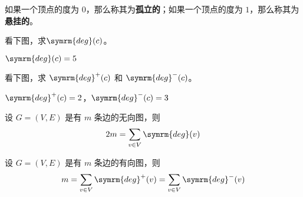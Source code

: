 如果一个顶点的度为 $0$，那么称其为\textbf{孤立的}；如果一个顶点的度为 $1$，那么称其为\textbf{悬挂的}。
\begin{collections}
    \begin{example}
        看下图，求$\symrm{deg}(c)$。
            \begin{center}
            \end{center}
    \end{example}
    \begin{solution}
        $\symrm{deg}(c)=5$
    \end{solution}
    \spare
    \begin{example}
        看下图，求 $\symrm{deg}^+(c)$ 和 $\symrm{deg}^-(c)$。
            \begin{center}
            \end{center}
    \end{example}
    \begin{solution}
        $\symrm{deg}^+(c)=2$，$\symrm{deg}^-(c)=3$
    \end{solution}
\end{collections}

\begin{theorem}[无向图的握手定理]\label{thm:无向图的握手定理}
    设 $G=(V,E)$ 是有 $m$ 条边的无向图，则
    \begin{equation*}
        2m = \sum_{v \in V} \symrm{deg}(v)
    \end{equation*}
\end{theorem}
\begin{theorem}[有向图的握手定理]\label{thm:有向图的握手定理}
    设 $G=(V,E)$ 是有 $m$ 条边的有向图，则
    \begin{equation*}
        m = \sum_{v \in V} \symrm{deg}^+(v) = \sum_{v \in V} \symrm{deg}^-(v)
    \end{equation*}
\end{theorem}

